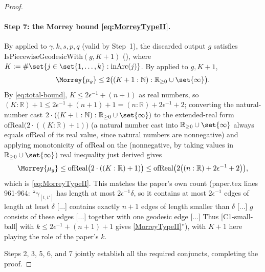 \begin{proof}
  \paragraph{Step 7: the Morrey bound \eqref{eq:MorreyTypeII}.} By
   applied to $\gamma,k,s,p,q$ (valid by Step~1), the
  discarded output $g$ satisfies $\mathrm{IsPiecewiseGeodesicWith}(g, K+1)$
  (), where $K := \#\set{j\in\set{1,\dots,k}:\mathrm{inArc}(j)}$.
  By  applied to $g,K+1$,
  \[
    \Morrey{\mu_g} \le 2\bigl((K+1:\mathbb{N}):\mathbb{R}_{\ge0}\cup\set{\infty}\bigr)
    .
  \]
  By \eqref{eq:total-bound}, $K \le 2\epsilon^{-1}+(n+1)$ as real numbers, so $(K:\mathbb{R})+1 \le
  2\epsilon^{-1}+(n+1)+1 = (n:\mathbb{R})+2\epsilon^{-1}+2$; converting the natural-number cast
  $2\cdot((K+1:\mathbb{N}):\mathbb{R}_{\ge0}\cup\set{\infty})$ to the extended-real form
  $\mathrm{ofReal}\bigl(2\cdot((K:\mathbb{R})+1)\bigr)$ (a natural number cast into
  $\mathbb{R}_{\ge0}\cup\set{\infty}$ always equals $\mathrm{ofReal}$ of its real value, since
  natural numbers are nonnegative) and applying monotonicity of $\mathrm{ofReal}$ on the (nonnegative,
  by  taking values in $\mathbb{R}_{\ge0}\cup\set{\infty}$) real inequality just
  derived gives
  \[
    \Morrey{\mu_g} \le \mathrm{ofReal}\bigl(2\cdot((K:\mathbb{R})+1)\bigr) \le
    \mathrm{ofReal}\bigl(2\bigl((n:\mathbb{R})+2\epsilon^{-1}+2\bigr)\bigr)
    ,
  \]
  which is \eqref{eq:MorreyTypeII}. This matches the paper's own count (paper.tex lines 961-964:
  ``$\gamma_{[t,t']}$ has length at most $2\epsilon^{-1}\delta$, so it contains at most
  $2\epsilon^{-1}$ edges of length at least $\delta$ [...] contains exactly $n+1$ edges of length
  smaller than $\delta$ [...] $g$ consists of these edges [...] together with one geodesic edge
  [...] Thus [C1-small-ball] with $k\le2\epsilon^{-1}+(n+1)+1$ gives \eqref{MorreyTypeII}''), with
  $K+1$ here playing the role of the paper's $k$.

  Steps 2, 3, 5, 6, and 7 jointly establish all the required conjuncts, completing the proof.
\end{proof}
